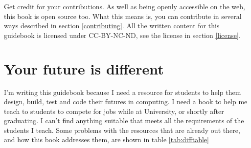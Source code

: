 \documentclass[
]{book}
\begin{document}
Get credit for your contributions. As well as being openly accessible on the web, this book is open source too. What this means is, you can contribute in several ways described in section \ref{contributing}. All the written content for this guidebook is licensed under CC-BY-NC-ND, see the license in section \ref{license}.

\hypertarget{thinkdifferent}{%
\section{Your future is different}\label{thinkdifferent}}

I'm writing this guidebook because I need a resource for students to help them design, build, test and code their futures in computing. I need a book to help me teach to students to compete for jobs while at University, or shortly after graduating. I can't find anything suitable that meets all the requirements of the students I teach. Some problems with the resources that are already out there, and how this book addresses them, are shown in table \ref{tab:difftable}
\end{document}
